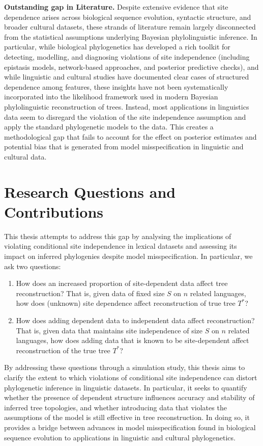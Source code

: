 \textbf{Outstanding gap in Literature.} Despite extensive evidence that site dependence arises across biological sequence evolution, syntactic structure, and broader cultural datasets, these strands of literature remain largely disconnected from the statistical assumptions underlying Bayesian phylolinguistic inference. In particular, while biological phylogenetics has developed a rich toolkit for detecting, modelling, and diagnosing violations of site independence (including epistasis models, network-based approaches, and posterior predictive checks), and while linguistic and cultural studies have documented clear cases of structured dependence among features, these insights have not been systematically incorporated into the likelihood framework used in modern Bayesian phylolinguistic reconstruction of trees. Instead, most applications in linguistics data seem to disregard the violation of the site independence assumption and apply the standard phylogenetic models to the data. This creates a methodological gap that fails to account for the effect on posterior estimates and potential bias that is generated from model misspecification in linguistic and cultural data.

\section{Research Questions and Contributions}
\label{sec:qns}
This thesis attempts to address this gap by analysing the implications of violating conditional site independence in lexical datasets and assessing its impact on inferred phylogenies despite model misspecification. In particular, we ask two questions:
\begin{enumerate}
    \item How does an increased proportion of site-dependent data affect tree reconstruction? That is, given data of fixed size $S$ on $n$ related languages, how does (unknown) site dependence affect reconstruction of true tree $T^*$?
    \item How does adding dependent data to independent data affect reconstruction? That is, given data that maintains site independence of size $S$ on $n$ related languages, how does adding data that is known to be site-dependent affect reconstruction of the true tree $T^*$?
\end{enumerate}
By addressing these questions through a simulation study, this thesis aims to clarify the extent to which violations of conditional site independence can distort phylogenetic inference in linguistic datasets. In particular, it seeks to quantify whether the presence of dependent structure influences accuracy and stability of inferred tree topologies, and whether introducing data that violates the assumptions of the model is still effective in tree reconstruction. In doing so, it provides a bridge between advances in model misspecification found in biological sequence evolution to applications in linguistic and cultural phylogenetics.

